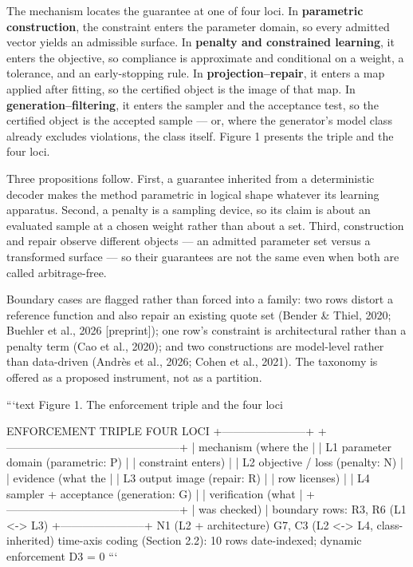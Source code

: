\documentclass[11pt]{article}
\begin{document}
The mechanism locates the guarantee at one of four loci. In \textbf{parametric construction}, the constraint enters the parameter domain, so every admitted vector yields an admissible surface. In \textbf{penalty and constrained learning}, it enters the objective, so compliance is approximate and conditional on a weight, a tolerance, and an early-stopping rule. In \textbf{projection–repair}, it enters a map applied after fitting, so the certified object is the image of that map. In \textbf{generation–filtering}, it enters the sampler and the acceptance test, so the certified object is the accepted sample — or, where the generator's model class already excludes violations, the class itself. Figure 1 presents the triple and the four loci.

Three propositions follow. First, a guarantee inherited from a deterministic decoder makes the method parametric in logical shape whatever its learning apparatus. Second, a penalty is a sampling device, so its claim is about an evaluated sample at a chosen weight rather than about a set. Third, construction and repair observe different objects — an admitted parameter set versus a transformed surface — so their guarantees are not the same even when both are called arbitrage-free.

Boundary cases are flagged rather than forced into a family: two rows distort a reference function and also repair an existing quote set (Bender \& Thiel, 2020; Buehler et al., 2026 [preprint]); one row's constraint is architectural rather than a penalty term (Cao et al., 2020); and two constructions are model-level rather than data-driven (Andrès et al., 2026; Cohen et al., 2021). The taxonomy is offered as a proposed instrument, not as a partition.

```text Figure 1. The enforcement triple and the four loci

ENFORCEMENT TRIPLE                        FOUR LOCI +-----------------------+   +-----------------------------------------------+ | mechanism  (where the |   |  L1  parameter domain        (parametric: P)  | |   constraint enters)  |   |  L2  objective / loss        (penalty: N)     | | evidence   (what the  |   |  L3  output image            (repair: R)      | |   row licenses)       |   |  L4  sampler + acceptance    (generation: G)  | | verification (what    |   +-----------------------------------------------+ |   was checked)        |        boundary rows: R3, R6  (L1 <-> L3) +-----------------------+                    N1  (L2 + architecture) G7, C3 (L2 <-> L4, class-inherited) time-axis coding (Section 2.2): 10 rows date-indexed; dynamic enforcement D3 = 0 ```
\end{document}
